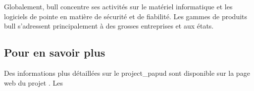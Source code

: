 Globalement, \gls{bull} concentre ses activités sur le matériel informatique et les logiciels de pointe en matière de sécurité et de fiabilité.
Les gammes de produits \gls{bull} s'adressent principalement à des grosses entreprises et aux états.

\subsection*{Pour en savoir plus}
Des informations plus détaillées sur le \gls{project_papud} sont disponible sur la page web du projet \autocite{about_papud}.
Les %
